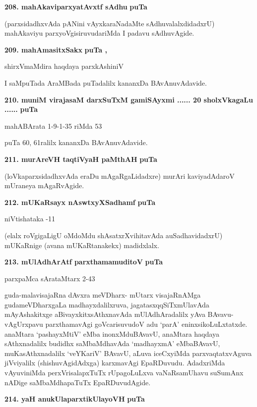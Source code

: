 \medskip
\noindent
\textbf{208. mahAkaviparxyatAvxtf sAdhu} \hfill{\bf puTa \pageref{216}}

\smallskip
(parxsidadhxvAda pANini vAyxkaraNadaMte sAdhuvalalxdidadxrU) mahAkaviyu parxyoVgisiruvudariMda I padavu sAdhuvAgide.

\medskip
\noindent
\textbf{209. mahAmasitxSakx} \hfill{\bf puTa \pageref{81}, \pageref{103}}

\hfill{shirxVmaMdira haqdaya parxkAshiniV}

\smallskip
I saMpuTada AraMBada puTadalilx kananxDa BAvAnuvAdavide.

\medskip
\noindent
\textbf{210. muniM virajasaM darxSuTxM gamiSAyxmi ...... 20 sholxVkagaLu ......} \hfill{\bf puTa \pageref{58}}

\hfill{mahABArata 1-9-1-35 riMda 53}

\smallskip
puTa 60, 61ralilx kananxDa BAvAnuvAdavide.

\noindent
\textbf{211. murAreVH taqtiVyaH paMthAH} \hfill{\bf puTa \pageref{248}}

\smallskip
(loVkaparxsidadhxvAda eraDu mAgaRgaLidadxre) murAri kaviyadAdaroV mUraneya mAgaRvAgide.

\medskip
\noindent
\textbf{212. mUKaRsayx nAswtxyXSadhamf} \hfill{\bf puTa \pageref{189}}

\hfill{niVtishataka -11}

(elalx roVgigaLigU oMdoMdu shAsatxrXvihitavAda auSadhavidadxrU) mUKaR\-nige (avana mUKaR\-tanakekx) madidxlalx.

\medskip
\noindent
\textbf{213. mUlAdhArAtf parxthamamuditoV} \hfill{\bf puTa \pageref{152}}

\hfill{parxpaMca sArataMtarx 2-43}

\smallskip
guda-malavisajaRna dAvxra meVDharx- mUtarx visajaRnAMga gudameVDharxgaLa madhayxdalilxruva, jagatasxqqSiTxmUlavAda mAyAshakitxge aBivayxkitx\-sAthxnavAda mUlA\-dhAra\-dalilx yAva BAvavu-vAgUrxpavu parxthamavAgi goVcarisuvudoV adu `parA' eninxsikoLuLxtatxde. anaMtara\- `pashayxMtiV' eMba inonxMdu\break BAvavU, anaMtara haqdaya sAthxnadalilx budidhx saMbaMdhavAda `madhayxmA' eMba\break BAvavU, muKa\-sAthxnadalilx `veYKariV' BAvavU, aLuva iceCxyiMda parxvaqtatxvAguva jiVviyalilx (shishuvAgidAdxga) karxmavAgi EpaRDuvudu. AdadxriMda vAyu\-viniMda perxVrisalapxTuTx rUpagoLuLxva vaNaR\-samUhavu suSumAnx nADige saMbaMdhapaTuTx EpaRDuvudAgide.

\medskip
\noindent
\textbf{214. yaH anukUlaparxtikUlayoVH} \hfill{\bf puTa \pageref{94}}

